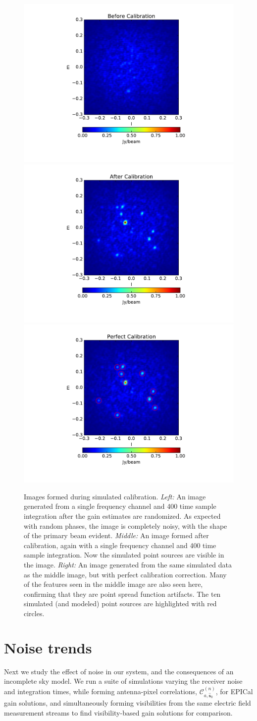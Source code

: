\documentclass[a4paper,fleqn,usenatbib]{mnras}
\newcommand{\spix}{\ensuremath{\hat{\mathbf{s}}_{0}}}
\newcommand{\Cna}[1][n]{\ensuremath{\mathcal{C}^{(#1)}_{a,\spix}}}
\begin{document}
\begin{figure}
\begin{center}
\includegraphics[width=.3\linewidth]{fig5a.pdf}
\includegraphics[width=.3\linewidth]{fig5b.pdf}
\includegraphics[width=.3\linewidth]{fig5c.pdf}
\caption{Images formed during simulated calibration. \emph{Left:} An image generated from a 
single frequency channel and 400 time sample integration after the gain estimates are randomized. As 
expected with random phases, the image is completely noisy, with the shape of the primary 
beam evident. \emph{Middle:} An image formed after calibration, again with a single frequency 
channel and 400 time sample integration. Now the simulated point sources are visible in the image. 
\emph{Right:} An image generated from the same simulated data as the middle image, but 
with perfect calibration correction. Many of the features seen in the middle image are also
seen here, confirming that they are point spread function artifacts. The ten simulated (and modeled) point sources are highlighted with red circles.
\label{fig:sim_images}
}
\end{center}
\end{figure}

\section{Noise trends}\label{sec:noise}
Next we study the effect of noise in our system, and the consequences 
of an incomplete sky model. We run a suite of simulations varying the receiver noise and 
integration times, while forming antenna-pixel correlations, $\Cna$, for EPICal gain solutions, 
and simultaneously forming visibilities from the same electric field measurement streams to find visibility-based 
gain solutions for comparison. 
\end{document}
